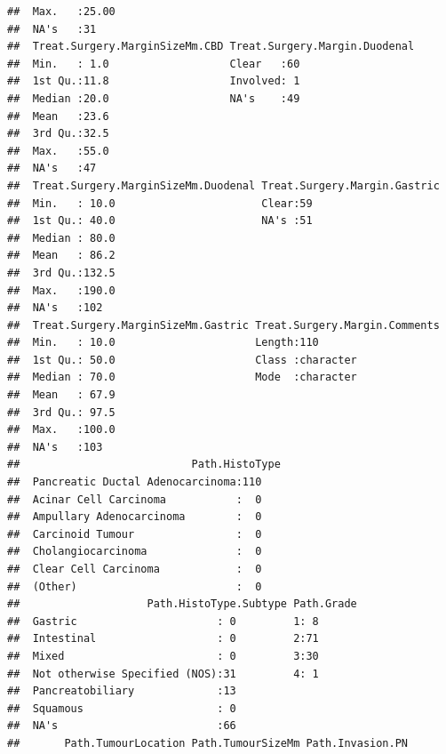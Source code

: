 \documentclass{article}\usepackage[]{graphicx}\usepackage[]{color}
\makeatletter
\newenvironment{kframe}{%
 \def\at@end@of@kframe{}%
 \ifinner\ifhmode%
  \def\at@end@of@kframe{\end{minipage}}%
  \begin{minipage}{\columnwidth}%
 \fi\fi%
 \def\FrameCommand##1{\hskip\@totalleftmargin \hskip-\fboxsep
 \colorbox{shadecolor}{##1}\hskip-\fboxsep
     \hskip-\linewidth \hskip-\@totalleftmargin \hskip\columnwidth}%
 \MakeFramed {\advance\hsize-\width
   \@totalleftmargin\z@ \linewidth\hsize
   \@setminipage}}%
 {\par\unskip\endMakeFramed%
 \at@end@of@kframe}
\newenvironment{knitrout}{}{} %
\makeatother
\begin{document}
\begin{knitrout}
\begin{kframe}
\begin{verbatim}
##  Max.   :25.00                                             
##  NA's   :31                                                
##  Treat.Surgery.MarginSizeMm.CBD Treat.Surgery.Margin.Duodenal
##  Min.   : 1.0                   Clear   :60                  
##  1st Qu.:11.8                   Involved: 1                  
##  Median :20.0                   NA's    :49                  
##  Mean   :23.6                                                
##  3rd Qu.:32.5                                                
##  Max.   :55.0                                                
##  NA's   :47                                                  
##  Treat.Surgery.MarginSizeMm.Duodenal Treat.Surgery.Margin.Gastric
##  Min.   : 10.0                       Clear:59                    
##  1st Qu.: 40.0                       NA's :51                    
##  Median : 80.0                                                   
##  Mean   : 86.2                                                   
##  3rd Qu.:132.5                                                   
##  Max.   :190.0                                                   
##  NA's   :102                                                     
##  Treat.Surgery.MarginSizeMm.Gastric Treat.Surgery.Margin.Comments
##  Min.   : 10.0                      Length:110                   
##  1st Qu.: 50.0                      Class :character             
##  Median : 70.0                      Mode  :character             
##  Mean   : 67.9                                                   
##  3rd Qu.: 97.5                                                   
##  Max.   :100.0                                                   
##  NA's   :103                                                     
##                           Path.HistoType
##  Pancreatic Ductal Adenocarcinoma:110   
##  Acinar Cell Carcinoma           :  0   
##  Ampullary Adenocarcinoma        :  0   
##  Carcinoid Tumour                :  0   
##  Cholangiocarcinoma              :  0   
##  Clear Cell Carcinoma            :  0   
##  (Other)                         :  0   
##                    Path.HistoType.Subtype Path.Grade
##  Gastric                      : 0         1: 8      
##  Intestinal                   : 0         2:71      
##  Mixed                        : 0         3:30      
##  Not otherwise Specified (NOS):31         4: 1      
##  Pancreatobiliary             :13                   
##  Squamous                     : 0                   
##  NA's                         :66                   
##       Path.TumourLocation Path.TumourSizeMm Path.Invasion.PN

\end{verbatim}
\end{kframe}
\end{knitrout}
\end{document}
